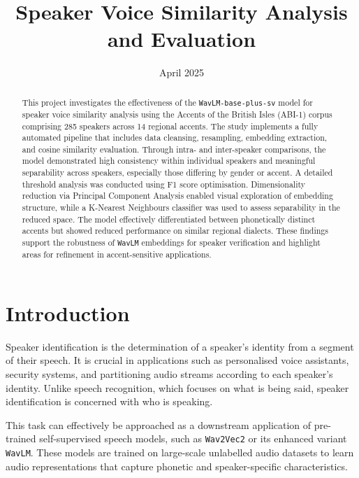 \documentclass[conference]{IEEEtran}
\begin{document}
	
	
	\title{Speaker Voice Similarity Analysis and Evaluation}
	
	
	\author{
		\date{April 2025}
		
	}
	
	\maketitle
	
	\begin{abstract}
		This project investigates the effectiveness of the \texttt{WavLM-base-plus-sv} model for speaker voice similarity analysis using the Accents of the British Isles (ABI-1) corpus comprising 285 speakers across 14 regional accents. The study implements a fully automated pipeline that includes data cleansing, resampling, embedding extraction, and cosine similarity evaluation. Through intra- and inter-speaker comparisons, the model demonstrated high consistency within individual speakers and meaningful separability across speakers, especially those differing by gender or accent. A detailed threshold analysis was conducted using F1 score optimisation. Dimensionality reduction via Principal Component Analysis enabled visual exploration of embedding structure, while a K-Nearest Neighbours classifier was used to assess separability in the reduced space. The model effectively differentiated between phonetically distinct accents but showed reduced performance on similar regional dialects. These findings support the robustness of \texttt{WavLM} embeddings for speaker verification and highlight areas for refinement in accent-sensitive applications.
	\end{abstract}
	
	\section{Introduction}
	
	Speaker identification is the determination of a speaker's identity from a segment of their speech. It is crucial in applications such as personalised voice assistants, security systems, and partitioning audio streams according to each speaker's identity. Unlike speech recognition, which focuses on what is being said, speaker identification is concerned with who is speaking.
	
	This task can effectively be approached as a downstream application of pre-trained self-supervised speech models, such as \texttt{Wav2Vec2}\cite{baevski2020wav2vec} or its enhanced variant \texttt{WavLM}\cite{chen2022wavlm}. These models are trained on large-scale unlabelled audio datasets to learn audio representations that capture phonetic and speaker-specific characteristics.
	
\end{document}
